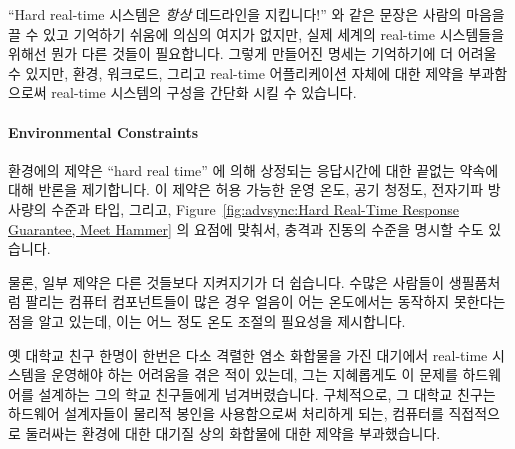 ``Hard real-time 시스템은 \emph{항상} 데드라인을 지킵니다!'' 와 같은 문장은
사람의 마음을 끌 수 있고 기억하기 쉬움에 의심의 여지가 없지만, 실제 세계의
real-time 시스템들을 위해선 뭔가 다른 것들이 필요합니다.
그렇게 만들어진 명세는 기억하기에 더 어려울 수 있지만, 환경, 워크로드, 그리고
real-time 어플리케이션 자체에 대한 제약을 부과함으로써 real-time 시스템의
구성을 간단화 시킬 수 있습니다.

\paragraph{Environmental Constraints}
\label{sec:advsync:Environmental Constraints}

환경에의 제약은 ``hard real time'' 에 의해 상정되는 응답시간에 대한 끝없는
약속에 대해 반론을 제기합니다.
이 제약은 허용 가능한 운영 온도, 공기 청정도, 전자기파 방사량의 수준과 타입,
그리고,
Figure~\ref{fig:advsync:Hard Real-Time Response Guarantee, Meet Hammer}
의 요점에 맞춰서, 충격과 진동의 수준을 명시할 수도 있습니다.

물론, 일부 제약은 다른 것들보다 지켜지기가 더 쉽습니다.
수많은 사람들이 생필품처럼 팔리는 컴퓨터 컴포넌트들이 많은 경우 얼음이 어는
온도에서는 동작하지 못한다는 점을 알고 있는데, 이는 어느 정도 온도 조절의
필요성을 제시합니다.

옛 대학교 친구 한명이 한번은 다소 격렬한 염소 화합물을 가진 대기에서 real-time
시스템을 운영해야 하는 어려움을 겪은 적이 있는데, 그는 지혜롭게도 이 문제를
하드웨어를 설계하는 그의 학교 친구들에게 넘겨버렸습니다.
구체적으로, 그 대학교 친구는 하드웨어 설계자들이 물리적 봉인을 사용함으로써
처리하게 되는, 컴퓨터를 직접적으로 둘러싸는 환경에 대한 대기질 상의 화합물에
대한 제약을 부과했습니다.
\iffalse

